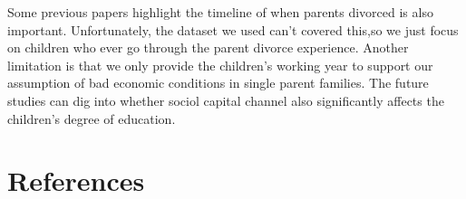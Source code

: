 \documentclass[]{AEA}
\begin{document}
    Some previous papers highlight the timeline of when parents divorced is also important. Unfortunately, the dataset we used can't covered this,so we just focus on children who ever go through the parent divorce experience. Another limitation is that we only provide the children's working year to support our assumption of bad economic conditions in single parent families. The future studies can dig into whether sociol capital channel also significantly affects the children's degree of education.



\section*{References}




\end{document}
